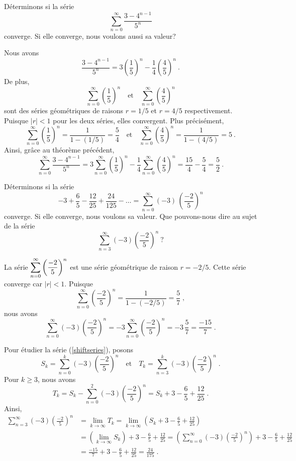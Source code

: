 {\begin{egg}[\eng]
Déterminons si la série
\[
\sum_{n=0}^\infty \frac{3-4^{n-1}}{5^n}
\]
converge.  Si elle converge, nous voulons aussi sa valeur?

Nous avons
\[
\frac{3-4^{n-1}}{5^n} =
3 \left( \frac{1}{5}\right)^n - \frac{1}{4} \left(\frac{4}{5}\right)^n \ .
\]
De plus,
\[
\sum_{n=0}^\infty \left( \frac{1}{5} \right)^n \quad \text{et}
\quad \sum_{n=0}^\infty \left( \frac{4}{5} \right)^n
\]
sont des séries géométriques de raisons $r = 1/5$ et $r = 4/5$
respectivement. Puisque $|r|<1$ pour les deux séries, elles
convergent.  Plus précisément,
\[
\sum_{n=0}^\infty \left( \frac{1}{5} \right)^n = \frac{1}{1-(1/5)} =
\frac{5}{4} \quad \text{et} \quad
\sum_{n=0}^\infty \left( \frac{4}{5} \right)^n = \frac{1}{1-(4/5)} = 5 \ .
\]
Ainsi, grâce au théorème précédent,
\[
\sum_{n=0}^\infty \frac{3-4^{n-1}}{5^n}
= 3 \sum_{n=0}^\infty \left( \frac{1}{5} \right)^n - \frac{1}{4}
\sum_{n=0}^\infty \left( \frac{4}{5} \right)^n
= \frac{15}{4} - \frac{5}{4} = \frac{5}{2} \ .
\]
\end{egg}

\begin{egg}[\eng]
Déterminons si la série
\[
-3+\frac{6}{5} -\frac{12}{25} + \frac{24}{125} - \ldots =
\sum_{n=0}^\infty (-3)\, \left(\frac{-2}{5}\right)^n
\]
converge.  Si elle converge, nous voulons sa valeur.  Que pouvons-nous
dire au sujet de la série
\begin{equation}\label{shiftseries}
\sum_{n=3}^\infty (-3)\left(\frac{-2}{5}\right)^n \ ?
\end{equation}

La série $\displaystyle \sum_{n=0}^\infty \left(\frac{-2}{5}\right)^n$ est une
série géométrique de raison $r = -2/5$.  Cette série converge car
$|r|<1$.  Puisque 
\[
\sum_{n=0}^\infty \left(\frac{-2}{5}\right)^n = \frac{1}{1-(-2/5)}
= \frac{5}{7} \; ,
\]
nous avons
\[
\sum_{n=0}^\infty (-3)\left(\frac{-2}{5}\right)^n
= -3 \sum_{n=0}^\infty \left(\frac{-2}{5}\right)^n
= -3 \, \frac{5}{7} = \frac{-15}{7} \; .
\]

Pour étudier la série (\ref{shiftseries}), posons
\[
S_k = \sum_{n=0}^k (-3)\left(\frac{-2}{5}\right)^n \quad \text{et}
\quad  T_k = \sum_{n=3}^k (-3)\left(\frac{-2}{5}\right)^n \; .
\]
Pour $k\geq 3$, nous avons
\[
T_k = S_k - \sum_{n=0}^2 (-3)\left(\frac{-2}{5}\right)^n
= S_k + 3 - \frac{6}{5} + \frac{12}{25} \; .
\]
Ainsi,
\begin{align*}
 \sum_{n=3}^\infty (-3)\left(\frac{-2}{5}\right)^n &=
\lim_{k\rightarrow \infty} T_k = \lim_{k\rightarrow \infty}
\left(S_k + 3 - \frac{6}{5} + \frac{12}{25} \right) \\
& = \left(\lim_{k\rightarrow \infty} S_k\right)
+ 3 - \frac{6}{5} + \frac{12}{25}
= \left( \sum_{n=0}^\infty (-3)\left(\frac{-2}{5}\right)^n \right)
+ 3 - \frac{6}{5} + \frac{12}{25} \\
& = \frac{-15}{7} + 3 - \frac{6}{5} + \frac{12}{25}
= \frac{24}{175} \; .
\end{align*}
\end{egg}

}
